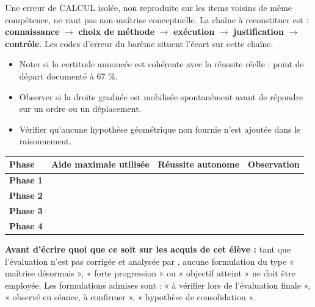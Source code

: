 \documentclass[10pt,a4paper]{article}
\begin{document}
Une erreur de \textsc{CALCUL} isolée, non reproduite sur les items voisins de même compétence, ne vaut pas non-maîtrise conceptuelle. La chaîne à reconstituer est : \textbf{connaissance} $\rightarrow$ \textbf{choix de méthode} $\rightarrow$ \textbf{exécution} $\rightarrow$ \textbf{justification} $\rightarrow$ \textbf{contrôle}. Les codes d'erreur du barème situent l'écart sur cette chaîne.
\begin{itemize}\item Noter si la certitude annoncée est cohérente avec la réussite réelle : point de départ documenté à 67 \%.\item Observer si la droite graduée est mobilisée spontanément avant de répondre sur un ordre ou un déplacement.\item Vérifier qu'aucune hypothèse géométrique non fournie n'est ajoutée dans le raisonnement.\end{itemize}
\par\noindent\begin{tabularx}{\linewidth}{>{\bfseries}p{26mm} X X X}
\toprule Phase & Aide maximale utilisée & Réussite autonome & Observation \\ \midrule
Phase 1 & & & \\[6mm]
Phase 2 & & & \\[6mm]
Phase 3 & & & \\[6mm]
Phase 4 & & & \\[6mm]
\bottomrule\end{tabularx}
\begin{warningbox}\textbf{Avant d'écrire quoi que ce soit sur les acquis de cet élève :} tant que l'évaluation n'est pas corrigée et analysée par , aucune formulation du type « maîtrise désormais », « forte progression » ou « objectif atteint » ne doit être employée. Les formulations admises sont : « à vérifier lors de l'évaluation finale », « observé en séance, à confirmer », « hypothèse de consolidation ».\end{warningbox}
\end{document}
